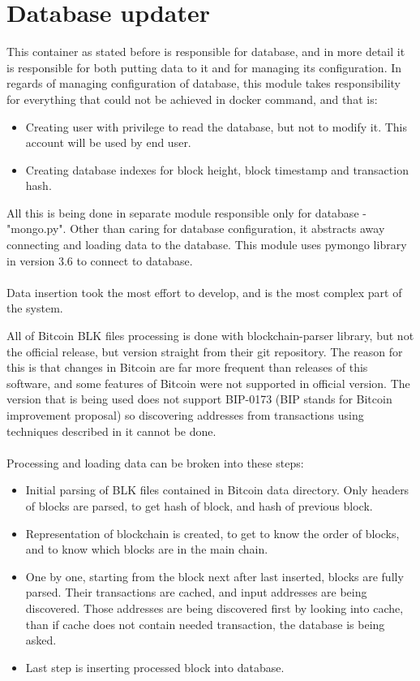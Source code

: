 \documentclass[12pt, en, eng, oneside, final]{mgr}
\begin{document}
\section{Database updater}
This container as stated before is responsible for database, and in more detail it is responsible for both putting data to it and for managing its configuration. In regards of managing configuration of database, this module takes responsibility for everything that could not be achieved in docker command, and that is:

\begin{itemize}
\item
Creating user with privilege to read the database, but not to modify it. This account will be used by end user.
\item
Creating database indexes for block height, block timestamp and transaction hash.
\end{itemize}

All this is being done in separate module responsible only for database - "mongo.py". Other than caring for database configuration, it abstracts away connecting and loading data to the database. This module uses pymongo\cite{pymongo} library in version 3.6 to connect to database.
\\
\\  
Data insertion took the most effort to develop, and is the most complex part of the system.

All of Bitcoin BLK files processing is done with blockchain-parser\cite{blockchain-parser} library, but not the official release, but version straight from their git repository\cite{blockchain-parser}. The reason for this is that changes in Bitcoin are far more frequent than releases of this software, and some features of Bitcoin were not supported in official version. The version that is being used does not support BIP-0173\cite{bip173} (BIP stands for Bitcoin improvement proposal) so discovering addresses from transactions using techniques described in it cannot be done. 
\\
\\
Processing and loading data can be broken into these steps:
\begin{itemize}
\item
Initial parsing of BLK files contained in Bitcoin data directory. Only headers of blocks are parsed, to get hash of block, and hash of previous block.
\item
Representation of blockchain is created, to get to know the order of blocks, and to know which blocks are in the main chain.
\item
One by one, starting from the block next after last inserted, blocks are fully parsed. Their transactions are cached, and input addresses are being discovered. Those addresses are being discovered first by looking into cache, than if cache does not contain needed transaction, the database is being asked.
\item
Last step is inserting processed block into database.
\end{itemize}
\end{document}
